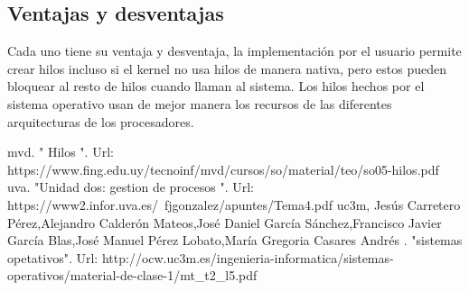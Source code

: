 \documentclass[letterpaper, 12pt]{article}
\begin{document}
\subsection{Ventajas y desventajas}
Cada uno tiene su ventaja y desventaja, la implementación por el usuario permite crear hilos incluso si el kernel no usa hilos de manera nativa, pero estos pueden bloquear al resto de hilos cuando llaman al sistema. Los hilos hechos por el sistema operativo usan de mejor manera los recursos de las diferentes arquitecturas de los procesadores.
\begin{thebibliography}{0}
 mvd. " Hilos ". Url: https://www.fing.edu.uy/tecnoinf/mvd/cursos/so/material/teo/so05-hilos.pdf
 uva. "Unidad dos: gestion de procesos ". Url: https://www2.infor.uva.es/~fjgonzalez/apuntes/Tema4.pdf
 uc3m, Jesús Carretero Pérez,Alejandro Calderón Mateos,José Daniel García Sánchez,Francisco Javier García Blas,José Manuel Pérez Lobato,María Gregoria Casares Andrés . "sistemas opetativos". Url: http://ocw.uc3m.es/ingenieria-informatica/sistemas-operativos/material-de-clase-1/mt_t2_l5.pdf
\end{thebibliography}
\end{document}
